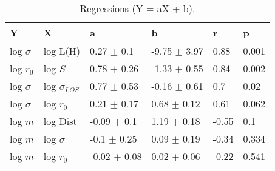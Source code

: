 \begin{table}
\centering
\caption{Regressions (Y = aX + b).}
\begin{tabular}{llllll}
\toprule
            Y &                   X &                 a &                 b &      r &      p \\
\midrule
 log $\sigma$ &            log L(H) &    0.27 $\pm$ 0.1 &  -9.75 $\pm$ 3.97 &   0.88 &  0.001 \\
    log $r_0$ &             log $S$ &   0.78 $\pm$ 0.26 &  -1.33 $\pm$ 0.55 &   0.84 &  0.002 \\
 log $\sigma$ &  log $\sigma_{LOS}$ &   0.77 $\pm$ 0.53 &  -0.16 $\pm$ 0.61 &    0.7 &   0.02 \\
 log $\sigma$ &         log $r_{0}$ &   0.21 $\pm$ 0.17 &   0.68 $\pm$ 0.12 &   0.61 &  0.062 \\
      log $m$ &            log Dist &   -0.09 $\pm$ 0.1 &   1.19 $\pm$ 0.18 &  -0.55 &    0.1 \\
      log $m$ &        log $\sigma$ &   -0.1 $\pm$ 0.25 &   0.09 $\pm$ 0.19 &  -0.34 &  0.334 \\
      log $m$ &         log $r_{0}$ &  -0.02 $\pm$ 0.08 &   0.02 $\pm$ 0.06 &  -0.22 &  0.541 \\
\bottomrule
\end{tabular}
\end{table}
